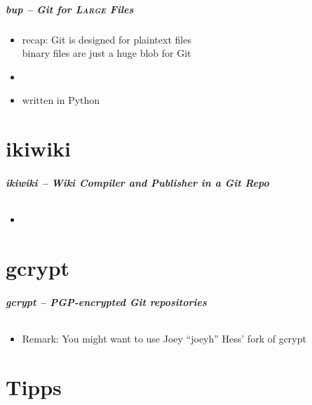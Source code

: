 \documentclass[english,hyperref={pdfpagelabels=false},aspectratio=169]{beamer}
\begin{document}
\begin{frame}[label=bup]
  \frametitle{bup -- Git for \textsc{Large} Files}
  \begin{itemize}
    \item recap: Git is designed for plaintext files\\
      {\scriptsize binary files are just a huge blob for Git}
    \item 
    \item written in Python
  \end{itemize}
\end{frame}


\part{ikiwiki}
\makepart

\begin{frame}[label=ikiwiki]
  \frametitle{ikiwiki -- Wiki Compiler and Publisher in a Git Repo}
  \framesubtitle{}
  \begin{itemize}
    \item 
  \end{itemize}
\end{frame}


\part{gcrypt}
\makepart

\begin{frame}[label=gcrypt]
  \frametitle{gcrypt -- PGP-encrypted Git repositories}
  \framesubtitle{}
  \begin{itemize}
    \item Remark: You might want to use Joey ``joeyh'' Hess' fork of gcrypt
  \end{itemize}
\end{frame}


\part{Tipps}
\makepart
\end{document}
